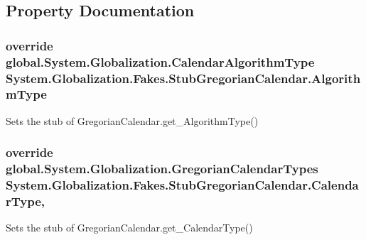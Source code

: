 \subsection{Property Documentation}
\hypertarget{class_system_1_1_globalization_1_1_fakes_1_1_stub_gregorian_calendar_aab68cd380f90b5ed4c9dfc63ce8e206b}{
\subsubsection[{Algorithm\-Type}]{\setlength{\rightskip}{0pt plus 5cm}override global.\-System.\-Globalization.\-Calendar\-Algorithm\-Type System.\-Globalization.\-Fakes.\-Stub\-Gregorian\-Calendar.\-Algorithm\-Type\hspace{0.3cm}{\ttfamily [get]}}}\label{class_system_1_1_globalization_1_1_fakes_1_1_stub_gregorian_calendar_aab68cd380f90b5ed4c9dfc63ce8e206b}


Sets the stub of Gregorian\-Calendar.\-get\-\_\-\-Algorithm\-Type()

\hypertarget{class_system_1_1_globalization_1_1_fakes_1_1_stub_gregorian_calendar_a00abf89d4e56f268ec2ac2ca6807b134}{
\subsubsection[{Calendar\-Type}]{\setlength{\rightskip}{0pt plus 5cm}override global.\-System.\-Globalization.\-Gregorian\-Calendar\-Types System.\-Globalization.\-Fakes.\-Stub\-Gregorian\-Calendar.\-Calendar\-Type\hspace{0.3cm}{\ttfamily [get]}, {\ttfamily [set]}}}\label{class_system_1_1_globalization_1_1_fakes_1_1_stub_gregorian_calendar_a00abf89d4e56f268ec2ac2ca6807b134}


Sets the stub of Gregorian\-Calendar.\-get\-\_\-\-Calendar\-Type()

